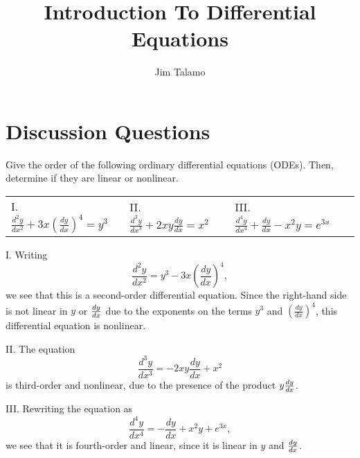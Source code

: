 \documentclass[]{ximera}
\author{Jim Talamo}
\title{Introduction To Differential Equations}
\begin{document}
\begin{abstract}
\end{abstract}
\maketitle

\vspace{-0.9in}

\section{Discussion Questions}

\begin{problem} 

Give the order of the following ordinary differential equations (ODEs). Then, determine if they are linear or nonlinear.

\begin{tabular}{lll}
I. $\frac{d^2y}{dx^2}+3x \left(\frac{dy}{dx}\right)^4  = y^3$ \qquad & II. $\frac{d^3y}{dx^3} + 2xy\frac{dy}{dx} = x^2$  \qquad & III. $\frac{d^4y}{dx^4}+\frac{dy}{dx} -x^2y=e^{3x}$
\end{tabular}

\begin{solution}
I. Writing 
$$
\frac{d^2y}{dx^2}  =  y^3 - 3x \left(\frac{dy}{dx}\right)^4,
$$
we see that this is a second-order differential equation. Since the right-hand side is not linear in $y$ or $\frac{\mathop{}\!d y}{\mathop{}\!d x}$ due to the exponents on the terms $y^3$ and $\left(\frac{dy}{dx}\right)^4$, this differential equation is nonlinear.

II. The equation
$$
\frac{d^3y}{dx^3} = - 2xy\frac{dy}{dx} + x^2
$$
is third-order and nonlinear, due to the presence of the product $y \frac{\mathop{}\!d y}{\mathop{}\!d x}$. 

III. Rewriting the equation as 
$$
\frac{d^4y}{dx^4} = -\frac{dy}{dx} + x^2y + e^{3x},
$$
we see that it is fourth-order and linear, since it is linear in $y$ and $\frac{\mathop{}\!d y}{\mathop{}\!d x}$. 
\end{solution}
\end{problem}
\end{document}
